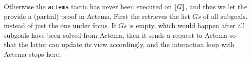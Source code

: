 Otherwise the \texttt{actema} tactic has never been executed on $\llbracket G \rrbracket$,
and thus we let the  provide a (partial) proof in Actema. First
the  retrieves the list $Gs$ of all subgoals, instead of just
the one under focus. If $Gs$ is empty, which would happen after all subgoals
have been solved from Actema, then it sends a  request to Actema so
that the latter can update its view accordingly, and the interaction loop with
Actema stops here.

